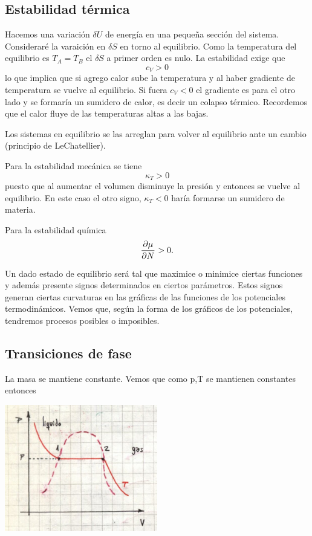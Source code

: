 \documentclass[10pt,oneside]{CBFT_book}
\begin{document}
\subsection{Estabilidad térmica}

Hacemos una variación $\delta U$  de energía en una pequeña sección del sistema.
Consideraré la varaición en $\delta S$ en torno al equilibrio.
Como la temperatura del equilibrio es $T_A = T_B$ el $\delta S$ a primer orden
es nulo. La estabilidad exige que
\[
	c_V > 0
\]
lo que implica que si agrego calor sube la temperatura y al haber gradiente de
temperatura se vuelve al equilibrio.
Si fuera $c_V < 0$ el gradiente es para el otro lado y se formaría un sumidero
de calor, es decir un colapso térmico. Recordemos que el calor fluye de las 
temperaturas altas a las bajas.

Los sistemas en equilibrio se las arreglan para volver al equilibrio ante un
cambio (principio de LeChatellier).

Para la estabilidad mecánica se tiene
\[
	\kappa_T > 0
\]
puesto que al aumentar el volumen disminuye la presión y entonces se vuelve al
equilibrio. En este caso el otro signo, $\kappa_T < 0$ haría formarse un
sumidero de materia.

Para la estabilidad química 
\[
	\frac{\partial^{\hspace{-0.05em}} {\mu}}{\partial {N}^{\hspace{-0.05em}}} > 0.
\]

Un dado estado de equilibrio será tal que maximice o minimice ciertas funciones
y además presente signos determinados en ciertos parámetros.
Estos signos generan ciertas curvaturas en las gráficas de las funciones de los
potenciales termodinámicos. Vemos que, según la forma de los gráficos de los
potenciales, tendremos procesos posibles o imposibles.

\subsection{Transiciones de fase}

La masa se mantiene constante. Vemos que como p,T se mantienen constantes entonces

\includegraphics[width=0.50\textwidth]{images/1606329049.jpg}
\end{document}
